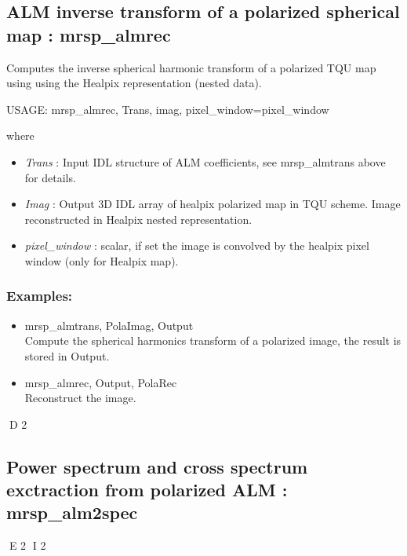 \subsection{ALM inverse transform of a polarized spherical map : mrsp\_almrec}
Computes the inverse spherical harmonic transform of a polarized TQU map using using the Healpix representation (nested data).
{\bf
\begin{center}
     USAGE: mrsp\_almrec, Trans, imag, pixel\_window=pixel\_window
\end{center}}
where
\begin{itemize}
\item {\em Trans} : Input IDL structure of ALM coefficients, see mrsp\_almtrans above for details.
\item {\em Imag} : Output 3D IDL array of healpix polarized map in TQU scheme. Image reconstructed in Healpix nested representation.
\item {\em pixel\_window} : scalar, if set the image is convolved by the healpix pixel window (only for Healpix map).
\end{itemize}

\subsubsection*{Examples:} 
\begin{itemize}
\item mrsp\_almtrans, PolaImag, Output \\
Compute the spherical harmonics transform of a polarized image, the result is stored in Output.
\item mrsp\_almrec, Output, PolaRec \\
Reconstruct the image.
\end{itemize}



D 2
\subsection{Power spectrum and cross spectrum exctraction from polarized ALM : mrsp\_alm2spec}
E 2
I 2
